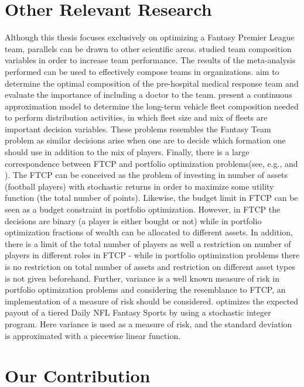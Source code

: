 \section{Other Relevant Research}
Although this thesis focuses exclusively on optimizing a Fantasy Premier League team, parallels can be drawn to other scientific areas. \cite{Bell} studied team composition variables in order to increase team performance. The results of the meta-analysis performed can be used to effectively compose teams in organizations. \cite{Davis} aim to determine the optimal composition of the pre-hospital medical response team and evaluate the importance of including a doctor to the team. \cite{Jabali} present a continuous approximation model to determine the long-term vehicle fleet composition needed to perform distribution activities, in which fleet size and mix of fleets are important decision variables.  These problems resembles the Fantasy Team problem as similar decisions arise when one are to decide which formation one should use in addition to the mix of players. 
\newpar
Finally, there is a large correspondence between FTCP and portfolio optimization problems(see, e.g., \cite{Markowitz} and \cite{Speranza}). The FTCP can be conceived as the problem of investing in number of assets (football players) with stochastic returns in order to maximize some utility function (the total number of points). Likewise, the budget limit in FTCP can be seen as a budget constraint in portfolio optimization. However, in FTCP the decisions are binary (a player is either bought or not) while in portfolio optimization fractions of wealth can be allocated to different assets. In addition, there is a limit of the total number of players as well a restriction on number of players in different roles in FTCP - while in portfolio optimization problems there is no restriction on total number of assets and restriction on different asset types is not given beforehand. Further, variance is a well known measure of risk in portfolio optimization problems and considering the resemblance to FTCP, an implementation of a measure of risk should be considered. \cite{Dailyfantasysports} optimizes the expected payout of a tiered Daily NFL Fantasy Sports by using a stochastic integer program. Here variance is used as a measure of risk, and the standard deviation is approximated with a piecewise linear function. 

\section{Our Contribution}


